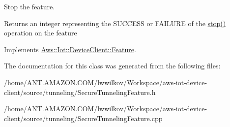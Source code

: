 Stop the feature. 

\begin{DoxyReturn}{Returns}
an integer representing the S\+U\+C\+C\+E\+SS or F\+A\+I\+L\+U\+RE of the \hyperlink{class_aws_1_1_iot_1_1_device_client_1_1_secure_tunneling_1_1_secure_tunneling_feature_a9cd3840b50bd1f62537df3354c7d2fbf}{stop()} operation on the feature 
\end{DoxyReturn}


Implements \hyperlink{class_aws_1_1_iot_1_1_device_client_1_1_feature_a5b672f7b1403512cad9104ba923fc73d}{Aws\+::\+Iot\+::\+Device\+Client\+::\+Feature}.



The documentation for this class was generated from the following files\+:\begin{DoxyCompactItemize}
\item 
/home/\+A\+N\+T.\+A\+M\+A\+Z\+O\+N.\+C\+O\+M/lwwilkov/\+Workspace/aws-\/iot-\/device-\/client/source/tunneling/Secure\+Tunneling\+Feature.\+h\item 
/home/\+A\+N\+T.\+A\+M\+A\+Z\+O\+N.\+C\+O\+M/lwwilkov/\+Workspace/aws-\/iot-\/device-\/client/source/tunneling/Secure\+Tunneling\+Feature.\+cpp\end{DoxyCompactItemize}
